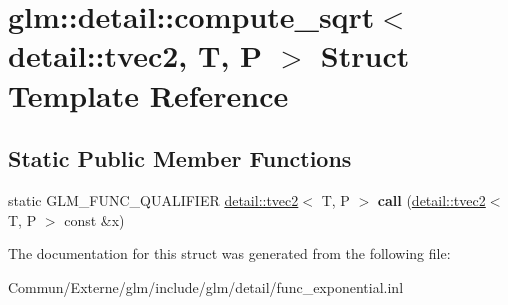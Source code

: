 \hypertarget{structglm_1_1detail_1_1compute__sqrt_3_01detail_1_1tvec2_00_01_t_00_01_p_01_4}{}\section{glm\+:\+:detail\+:\+:compute\+\_\+sqrt$<$ detail\+:\+:tvec2, T, P $>$ Struct Template Reference}
\label{structglm_1_1detail_1_1compute__sqrt_3_01detail_1_1tvec2_00_01_t_00_01_p_01_4}
\subsection*{Static Public Member Functions}
\begin{DoxyCompactItemize}
\item 
static G\+L\+M\+\_\+\+F\+U\+N\+C\+\_\+\+Q\+U\+A\+L\+I\+F\+I\+ER \hyperlink{structglm_1_1detail_1_1tvec2}{detail\+::tvec2}$<$ T, P $>$ {\bfseries call} (\hyperlink{structglm_1_1detail_1_1tvec2}{detail\+::tvec2}$<$ T, P $>$ const \&x)\hypertarget{structglm_1_1detail_1_1compute__sqrt_3_01detail_1_1tvec2_00_01_t_00_01_p_01_4_aa1063e71bb3144910901a224d41d88f7}{}\label{structglm_1_1detail_1_1compute__sqrt_3_01detail_1_1tvec2_00_01_t_00_01_p_01_4_aa1063e71bb3144910901a224d41d88f7}

\end{DoxyCompactItemize}


The documentation for this struct was generated from the following file\+:\begin{DoxyCompactItemize}
\item 
Commun/\+Externe/glm/include/glm/detail/func\+\_\+exponential.\+inl\end{DoxyCompactItemize}
